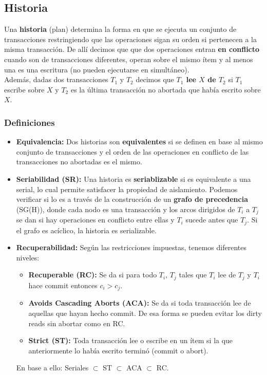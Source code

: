 \subsection*{Historia}
Una \textbf{historia} (plan) determina la forma en que se ejecuta un conjunto de transacciones restringiendo que las operaciones sigan su orden si pertenecen a la misma transacción. De allí decimos que que dos operaciones entran \textbf{en conflicto} cuando son de transacciones diferentes, operan sobre el mismo ítem y al menos una es una escritura (no pueden ejecutarse en simultáneo). \\
Además, dadas dos transacciones $T_1$ y $T_2$ decimos que \textbf{$T_1$ lee $X$ de $T_2$} si $T_1$ escribe sobre $X$ y $T_2$ es la última transacción no abortada que había escrito sobre $X$.

\subsubsection*{Definiciones}
\begin{itemize}
    \item \textbf{Equivalencia:} Dos historias son \textbf{equivalentes} si se definen en base al mismo conjunto de transacciones y el orden de las operaciones en conflicto de las transacciones no abortadas es el mismo.
    \item \textbf{Seriabilidad (SR):} Una historia es \textbf{seriablizable} si es equivalente a una serial, lo cual permite satisfacer la propiedad de aislamiento. Podemos verificar si lo es a través de la construcción de un \textbf{grafo de precedencia} (SG(H)), donde cada nodo es una transacción y los arcos dirigidos de $T_i$ a $T_j$ se dan si hay operaciones en conflicto entre ellas y $T_i$ sucede antes que $T_j$. Si el grafo es acíclico, la historia es serializable.
    \item \textbf{Recuperabilidad:} Según las restricciones impuestas, tenemos diferentes niveles:
    \begin{itemize}
    \item \textbf{Recuperable (RC):} Se da si para todo $T_i$, $T_j$ tales que $T_i$ lee de $T_j$ y $T_i$ hace commit entonces $c_i > c_j$.
    \item \textbf{Avoids Cascading Aborts (ACA):} Se da si toda transacción lee de aquellas que hayan hecho commit. De esa forma se pueden evitar los dirty reads sin abortar como en RC.
    \item \textbf{Strict (ST):} Toda transacción lee o escribe en un ítem si la que anteriormente lo había escrito terminó (commit o abort).
    \end{itemize}
    En base a ello: Seriales $\subset$ ST $\subset$ ACA $\subset$ RC.    
\end{itemize}

